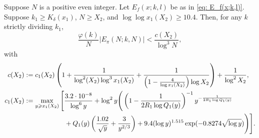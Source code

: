 \documentclass[12pt]{amsart}
\begin{document}
\begin{lemma}\label{lem: general-5.3.2}
Suppose $N$ is a positive even integer.
Let $E_f(x;k,l)$ be as in \eqref{eq: E_f(x;k,l)}.
Suppose $k_1\ge K_{\delta}(x_1)$, $N \ge X_2$, and $\log\log x_1 (X_2)\ge 10.4$. Then, for any $k$ strictly dividing $k_1$,
$$\frac{\varphi(k)}{N}|E_{\pi}(N; k, N)| < \frac{c(X_2)}{\log^3 N},$$
with
\begin{align}
    c(X_2)&:=c_1(X_2)\left(1+\frac{1}{\log^2(X_2)\log^3x_1(X_2)}+\frac{1}{\left(1-\frac{4}{\log x_1(X_2)}\right)\log X_2}\right)+\frac{1}{\log^2 X_2}, \notag\\
    c_1(X_2) &:= \max_{y\ge x_1(X_2)}\Bigg[\frac{3.2 \cdot 10^{-8}}{\log^{6} y} + \log^2y\Bigg(\left(1 - \frac{1}{2 R_1 \log Q_1(y)} \right)^{-1} y^{ - \frac{1}{2 R_1 \log Q_1(y)}} \notag\\
    &\qquad\qquad\qquad+ Q_1(y)\left(\frac{1.02}{\sqrt{y}}+\frac{3}{y^{2/3}}\right)
    + 9.4(\log y)^{1.515}\exp(-0.8274\sqrt{\log y})\Bigg)\Bigg].\label{c1eq}
\end{align}
\end{lemma}
\end{document}
